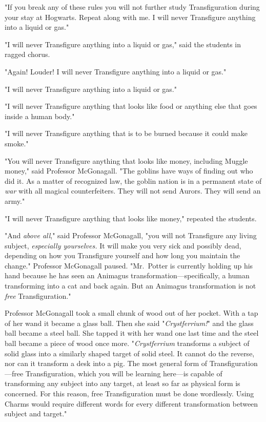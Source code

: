 "If you break any of these rules you will not further study Transfiguration
during your stay at Hogwarts. Repeat along with me. I will never Transfigure
anything into a liquid or gas."

"I will never Transfigure anything into a liquid or gas," said the students in
ragged chorus.

"Again! Louder! I will never Transfigure anything into a liquid or gas."

"I will never Transfigure anything into a liquid or gas."

"I will never Transfigure anything that looks like food or anything else that
goes inside a human body."

"I will never Transfigure anything that is to be burned because it could make
smoke."

"You will never Transfigure anything that looks like money, including Muggle
money," said Professor McGonagall. "The goblins have ways of finding out who
did it. As a matter of recognized law, the goblin nation is in a permanent
state of \emph{war} with all magical counterfeiters. They will not send Aurors.
They will send an army."

"I will never Transfigure anything that looks like money," repeated the
students.

"And \emph{above all}," said Professor McGonagall, "you will not Transfigure
any living subject, \emph{especially yourselves.} It will make you very sick
and possibly dead, depending on how you Transfigure yourself and how long you
maintain the change." Professor McGonagall paused. "Mr.~Potter is currently
holding up his hand because he has seen an Animagus
transformation---specifically, a human transforming into a cat and back again.
But an Animagus transformation is not \emph{free} Transfiguration."

Professor McGonagall took a small chunk of wood out of her pocket. With a tap
of her wand it became a glass ball. Then she said "\emph{Crystferrium!}" and
the glass ball became a steel ball. She tapped it with her wand one last time
and the steel ball became a piece of wood once more. "\emph{Crystferrium}
transforms a subject of solid glass into a similarly shaped target of solid
steel. It cannot do the reverse, nor can it transform a desk into a pig. The
most general form of Transfiguration---free Transfiguration, which you will be
learning here---is capable of transforming any subject into any target, at
least so far as physical form is concerned. For this reason, free
Transfiguration must be done wordlessly. Using Charms would require different
words for every different transformation between subject and target."

